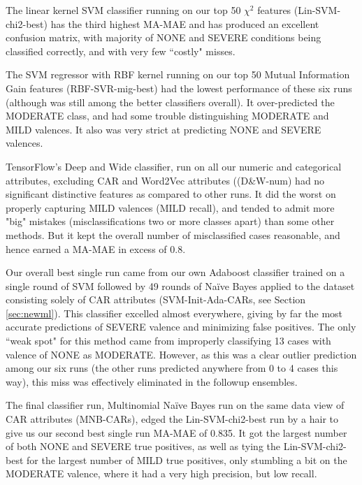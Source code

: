 The linear kernel SVM classifier running on our top 50 $\chi^2$ features
(\textsf{Lin-SVM-chi2-best}) has the third highest \textsf{MA-MAE} and
has produced an excellent confusion matrix, with majority of \textsf{NONE}
and \textsf{SEVERE} conditions being classified correctly, and with very few
``costly" misses.

The SVM regressor with RBF kernel running on our top 50 Mutual Information Gain features
(\textsf{RBF-SVR-mig-best}) had the lowest performance of these six runs
(although was still among the better classifiers overall). It over-predicted
the \textsf{MODERATE} class, and had some trouble distinguishing \textsf{MODERATE}
and \textsf{MILD} valences. It also was very strict at predicting \textsf{NONE}
and \textsf{SEVERE} valences.

TensorFlow's  Deep and Wide  classifier, run on all our
numeric and categorical attributes, excluding CAR and \textsf{Word2Vec}
attributes ((\textsf{D\&W-num}) had no significant distinctive features as compared to
other runs. It did the worst on properly capturing \textsf{MILD} valences
(\textsf{MILD} recall), and tended to admit more "big" mistakes
(misclassifications two or more classes apart) than some other methods. 
But it kept the overall number of misclassified cases reasonable,
and hence earned a \textsf{MA-MAE} in excess of 0.8.


Our overall best single run came from our own Adaboost classifier
trained on a single round of SVM followed by 49 rounds of Na\"{i}ve
Bayes applied to the dataset consisting solely of \textsf{CAR} attributes
(\textsf{SVM-Init-Ada-CARs}, see Section \ref{sec:newml}). 
This classifier excelled almost everywhere, giving by
far the most accurate predictions of \textsf{SEVERE} valence and minimizing
false positives. The only ``weak spot" for this method came from improperly
classifying 13 cases with valence of \textsf{NONE} as \textsf{MODERATE}.
However, as this was a clear outlier prediction among our six runs (the other
runs predicted anywhere from 0 to 4 cases this way), this miss was effectively
eliminated in the followup ensembles.

The final classifier run, Multinomial Na\"{i}ve Bayes run on the same
data view of CAR attributes (\textsf{MNB-CARs}), edged the \textsf{Lin-SVM-chi2-best}
run by a hair to give us our second best single run \textsf{MA-MAE} of 0.835.
It got the largest number of both \textsf{NONE} and \textsf{SEVERE} true
positives, as well as tying the \textsf{Lin-SVM-chi2-best} for the
largest number of \textsf{MILD} true positives, only stumbling
a bit on the \textsf{MODERATE} valence, where it had a very high precision,
but low recall. 







